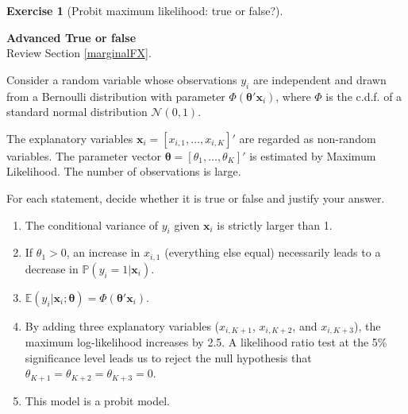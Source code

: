 \documentclass[
  11pt,
]{book}
\theoremstyle{definition}
\theoremstyle{definition}
\theoremstyle{definition}
\newtheorem{exercise}{Exercise}[chapter]
\theoremstyle{definition}
\theoremstyle{remark}
\begin{document}
\begin{exercisebox}

\begin{exercise}[Probit maximum likelihood: true or false?]
\protect\hypertarget{exr:binary-probit-mle-true-false}{}\label{exr:binary-probit-mle-true-false}

\textbf{Advanced \textbar{} True or false}\\
Review Section \ref{marginalFX}.

Consider a random variable whose observations \(y_i\) are independent and drawn from a Bernoulli distribution with parameter \(\Phi(\boldsymbol{\theta}'\mathbf{x}_i)\), where \(\Phi\) is the c.d.f. of a standard normal distribution \(\mathcal{N}(0,1)\).

The explanatory variables \(\mathbf{x}_i=[x_{i,1},\dots,x_{i,K}]'\) are regarded as non-random variables. The parameter vector \(\boldsymbol{\theta}=[\theta_1,\dots,\theta_K]'\) is estimated by Maximum Likelihood. The number of observations is large.

For each statement, decide whether it is true or false and justify your answer.

\begin{enumerate}
\def\labelenumi{\arabic{enumi}.}
\item
  The conditional variance of \(y_i\) given \(\mathbf{x}_i\) is strictly larger than 1.
\item
  If \(\theta_1>0\), an increase in \(x_{i,1}\) (everything else equal) necessarily leads to a decrease in \(\mathbb{P}(y_i=1|\mathbf{x}_i)\).
\item
  \(\mathbb{E}(y_i|\mathbf{x}_i;\boldsymbol{\theta})=\Phi(\boldsymbol{\theta}'\mathbf{x}_i)\).
\item
  By adding three explanatory variables (\(x_{i,K+1}\), \(x_{i,K+2}\), and \(x_{i,K+3}\)), the maximum log-likelihood increases by 2.5. A likelihood ratio test at the 5\% significance level leads us to reject the null hypothesis that \(\theta_{K+1}=\theta_{K+2}=\theta_{K+3}=0\).
\item
  This model is a probit model.
\end{enumerate}

\end{exercise}

\end{exercisebox}

\end{document}

